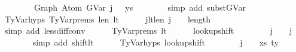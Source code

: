 \begin{isabellebody}
\ \ \ \ \ \ \ {\isacharequal}{\kern0pt}\ Graph\ {\isacharparenleft}{\kern0pt}Atom\ {\isacharparenleft}{\kern0pt}GVar\ {\isacharparenleft}{\kern0pt}j\ {\isacharminus}{\kern0pt}\ {}{\isacharparenright}{\kern0pt}{\isacharparenright}{\kern0pt}\ ys{\isacharparenright}{\kern0pt}{\isachardoublequoteclose}\isanewline
\ \ \ \ \ \ \isamarkupfalse%
\ {\isacharparenleft}{\kern0pt}simp\ add{\isacharcolon}{\kern0pt}\ subst{\isacharunderscore}{\kern0pt}GVar{\isacharparenright}{\kern0pt}\isanewline
\isanewline
\ \ \ \ \isamarkupfalse%
\ TyVar{\isachardot}{\kern0pt}hyps{\isacharparenleft}{\kern0pt}{}{\isacharparenright}{\kern0pt}\ TyVar{\isachardot}{\kern0pt}prems{\isacharparenleft}{\kern0pt}{}{\isacharparenright}{\kern0pt}\ len{\isacharunderscore}{\kern0pt}{\isasymGamma}{}\ lt\isanewline
\ \ \ \ \isamarkupfalse%
\ j{}{\isacharunderscore}{\kern0pt}lt{\isacharunderscore}{\kern0pt}len{\isacharunderscore}{\kern0pt}{\isasymGamma}{}{\isacharcolon}{\kern0pt}\ {\isachardoublequoteopen}j\ {\isacharminus}{\kern0pt}\ {}\ {\isacharless}{\kern0pt}\ length\ {\isasymGamma}{}{\isachardoublequoteclose}\isanewline
\ \ \ \ \ \ \isamarkupfalse%
\ {\isacharparenleft}{\kern0pt}simp\ add{\isacharcolon}{\kern0pt}\ less{\isacharunderscore}{\kern0pt}diff{\isacharunderscore}{\kern0pt}conv{\isacharparenright}{\kern0pt}\isanewline
\isanewline
\ \ \ \ \isamarkupfalse%
\ TyVar{\isachardot}{\kern0pt}prems{\isacharparenleft}{\kern0pt}{}{\isacharparenright}{\kern0pt}\ lt\isanewline
\ \ \ \ \isamarkupfalse%
\ lookup{\isacharunderscore}{\kern0pt}shift{\isacharcolon}{\kern0pt}\isanewline
\ \ \ \ \ \ {\isachardoublequoteopen}{\isasymGamma}\ {\isacharbang}{\kern0pt}\ j\ {\isacharequal}{\kern0pt}\ {\isasymGamma}{}\ {\isacharbang}{\kern0pt}\ {\isacharparenleft}{\kern0pt}j\ {\isacharminus}{\kern0pt}\ {}{\isacharparenright}{\kern0pt}{\isachardoublequoteclose}\isanewline
\ \ \ \ \ \ \isamarkupfalse%
\ {\isacharparenleft}{\kern0pt}simp\ add{\isacharcolon}{\kern0pt}\ shift{\isacharunderscore}{\kern0pt}lt{\isacharparenright}{\kern0pt}\isanewline
\isanewline
\ \ \ \ \isamarkupfalse%
\ TyVar{\isachardot}{\kern0pt}hyps{\isacharparenleft}{\kern0pt}{}{\isacharparenright}{\kern0pt}\ lookup{\isacharunderscore}{\kern0pt}shift\isanewline
\ \ \ \ \isamarkupfalse%
\ {\isachardoublequoteopen}{\isasymGamma}{}\ {\isacharbang}{\kern0pt}\ {\isacharparenleft}{\kern0pt}j\ {\isacharminus}{\kern0pt}\ {}{\isacharparenright}{\kern0pt}\ {\isacharequal}{\kern0pt}\ {\isacharparenleft}{\kern0pt}xs{\isacharprime}{\kern0pt}{\isacharcomma}{\kern0pt}\ ty{\isacharprime}{\kern0pt}{\isacharparenright}{\kern0pt}{\isachardoublequoteclose}\ \isamarkupfalse%

\end{isabellebody}
